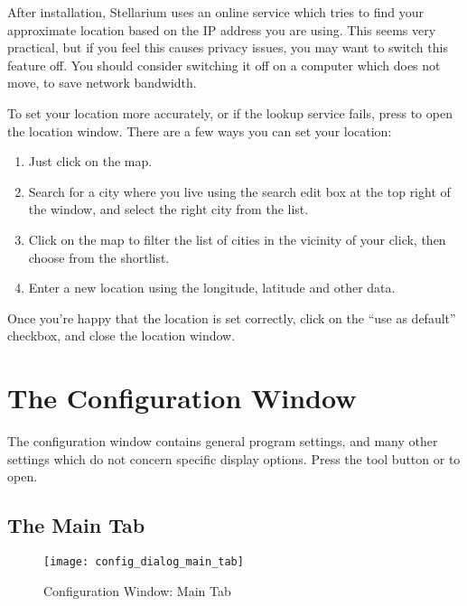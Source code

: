 After installation, Stellarium uses an online service which tries to
find your approximate location based on the IP address you are
using. This seems very practical, but if you feel this causes privacy
issues, you may want to switch this feature off. You should consider
switching it off on a computer which does not move, to save network
bandwidth.

To set your location more accurately, or if the lookup service fails,
press  to open the location window. There are a few ways you
can set your location:

\begin{enumerate}
\item Just click on the map.
\item Search for a city where you live using the search edit box at
  the top right of the window, and select the right city from the
  list.
\item Click on the map to filter the list of cities in the vicinity of
  your click, then choose from the shortlist.
\item Enter a new location using the longitude, latitude and other
  data.
\end{enumerate}

Once you're happy that the location is set correctly, click on the ``use
as default'' checkbox, and close the location window.



\section{The Configuration Window}
\label{sec:gui:configuration}

The configuration window contains general program settings, and many
other settings which do not concern specific display options. Press
the tool button  or  to open.


\subsection{The Main Tab}
\label{sec:gui:configuration:main}


\begin{figure}[p]
\centering\texttt{[image: config\_dialog\_main\_tab]}
\caption{Configuration Window: Main Tab}
\label{fig:gui:configuration:main}
\end{figure}



